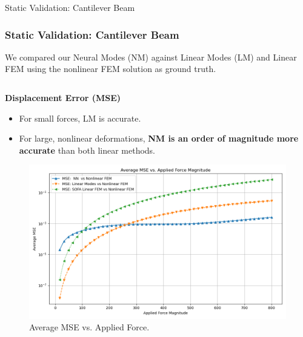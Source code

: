 \documentclass{beamer}
\begin{document}
\begin{frame}{Static Validation: Cantilever Beam}
    \frametitle{Static Validation: Cantilever Beam}
    
    We compared our Neural Modes (NM) against Linear Modes (LM) and Linear FEM using the nonlinear FEM solution as ground truth.
    
    \begin{columns}[T]
        \begin{column}{0.5\textwidth}
            \textbf{Displacement Error (MSE)}
            \begin{itemize}
                \item For small forces, LM is accurate.
                \item For large, nonlinear deformations, \textbf{NM is an order of magnitude more accurate} than both linear methods.
            \end{itemize}
            \begin{figure}
                \includegraphics[width=\textwidth]{Images/beam_static_mse.png}
                \caption{Average MSE vs. Applied Force.}
            \end{figure}
        \end{column}
        

\end{columns}
\end{frame}
\end{document}

